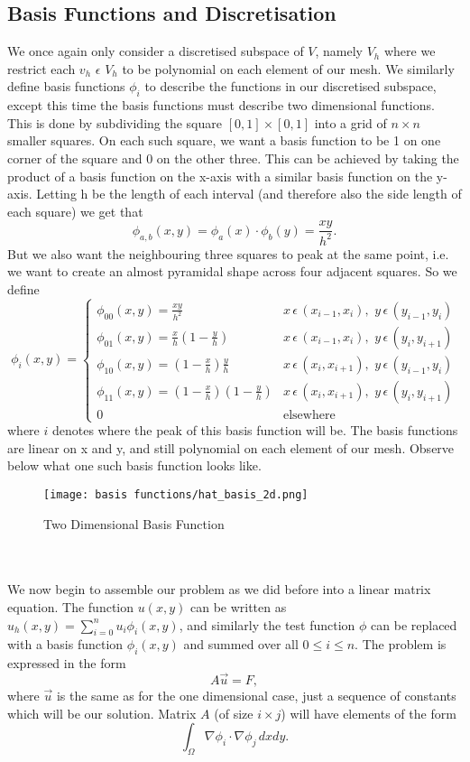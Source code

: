 \documentclass{article}
\begin{document}
\subsection{Basis Functions and Discretisation}
We once again only consider a discretised subspace of $V$, namely $V_h$ where we restrict each $v_h$ $\epsilon$ $V_h$ to be polynomial on each element of our mesh. We similarly define basis functions $\phi_i$ to describe the functions in our discretised subspace, except this time the basis functions must describe two dimensional functions. This is done by subdividing the square $[0,1]\times[0,1]$ into  a grid of $n\times n$ smaller squares. On each such square, we want a basis function to be 1 on one corner of the square and 0 on the other three. This can be achieved by taking the product of a basis function on the x-axis with a similar basis function on the y-axis. Letting h be the length of each interval (and therefore also the side length of each square) we get that $$ \phi_{a,b}(x,y) = \phi_a(x)\cdot\phi_b(y)  = \frac{xy}{h^2}.$$
But we also want the neighbouring three squares to peak at the same point, i.e. we want to create an almost pyramidal shape across four adjacent squares. So we define 
$$\phi_{i}(x,y) =  \begin{cases} 
      \phi_{00}(x,y) = \frac{xy}{h^2} & x\,\epsilon\, (x_{i-1}, x_{i}),\, \,y\,\epsilon\, (y_{i-1}, y_{i})\\
      \phi_{01}(x,y) = \frac{x}{h}(1 - \frac{y}{h})& x \,\epsilon\, (x_{i-1}, x_{i}), \,\,y\,\epsilon\, (y_{i}, y_{i+1})\\
      \phi_{10}(x,y) = (1 - \frac{x}{h})\frac{y}{h} & x \,\epsilon\, (x_{i}, x_{i+1}), \,\,y\,\epsilon\, (y_{i-1}, y_{i}) \\
      \phi_{11}(x,y) = (1 - \frac{x}{h})(1 - \frac{y}{h})& x\,\epsilon\, (x_{i}, x_{i+1}),\,\,y\,\epsilon\, (y_{i}, y_{i+1})\\
      0 & \textrm{elsewhere}
   \end{cases}$$
where $i$ denotes where the peak of this basis function will be. The basis functions are linear on x and y, and still polynomial on each element of our mesh. Observe below what one such basis function looks like. 
\begin{figure}[hbt!]
    \centering
    \texttt{[image: basis functions/hat\_basis\_2d.png]}
    \caption{Two Dimensional Basis Function}
    \label{fig:basis}
\end{figure}
\\
\\
We now begin to assemble our problem as we did before into a linear matrix equation. The function $u(x,y)$ can be written as $u_h(x,y) = \sum_{i=0}^{n}u_i\phi_i(x,y)$, and similarly the test function $\phi$ can be replaced with a basis function $\phi_i(x,y)$ and summed over all $0 \leq i \leq n.$ The problem is expressed in the form $$A \vec{u} = F,$$ where $\vec{u}$ is the same as for the one dimensional case, just a sequence of constants which will be our solution. Matrix $A$ (of size $i\times j$) will have elements of the form $$\int_{\Omega} \nabla \phi_i \cdot\nabla\phi_j \,dxdy.$$
\end{document}
